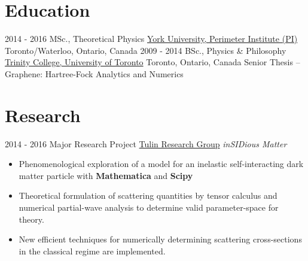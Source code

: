 \documentclass[letterpaper]{twentysecondcv} %
\begin{document}
\makeprofile %

\section{Education}

\begin{twenty} %
	\twentyitem
    	{2014 - 2016}
        {MSc., Theoretical Physics}
        {\href{http://www.yorku.ca/}{York University, Perimeter Institute (PI)}}
        {Toronto/Waterloo, Ontario, Canada}
        {}
	\twentyitem
    	{2009 - 2014}
        {BSc., Physics \& Philosophy}
        {\href{https://www.utoronto.ca/}{Trinity College, University of Toronto}}
        {Toronto, Ontario, Canada}
        {Senior Thesis -- Graphene: Hartree-Fock Analytics and Numerics}
\end{twenty}


\section{Research}
\begin{twenty}
	\twentyitem
    	{2014 - 2016}
        {Major Research Project}
        {\href{http://www.yorku.ca/stulin/research.html}{Tulin Research Group}}
        {\emph{inSIDious Matter}}
        {
        {\begin{itemize}
        \item Phenomenological exploration of a model for an inelastic self-interacting dark matter particle with \textbf{Mathematica} and \textbf{Scipy}
        \item Theoretical formulation of scattering quantities by tensor calculus and numerical partial-wave analysis to determine valid parameter-space for theory.
       	\item New efficient techniques for numerically determining scattering cross-sections in the classical regime are implemented.
    \end{itemize}}
        }
\end{twenty}

\end{document}
